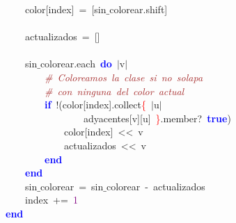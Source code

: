 \mbox{}\ \ \ \ \ \ \ \ \ \ \ \ color\textcolor{BrickRed}{[}index\textcolor{BrickRed}{]}\ \textcolor{BrickRed}{=}\ \textcolor{BrickRed}{[}sin$\_$colorear\textcolor{BrickRed}{.}shift\textcolor{BrickRed}{]} \\
\mbox{}\ \ \ \ \ \ \ \ \ \ \ \  \\
\mbox{}\ \ \ \ \ \ \ \ \ \ \ \ actualizados\ \textcolor{BrickRed}{=}\ \textcolor{BrickRed}{[]} \\
\mbox{}\ \ \ \ \ \ \ \ \ \ \ \  \\
\mbox{}\ \ \ \ \ \ \ \ \ \ \ \ sin$\_$colorear\textcolor{BrickRed}{.}each\ \textbf{\textcolor{Blue}{do}}\ \textcolor{BrickRed}{$|$}v\textcolor{BrickRed}{$|$} \\
\mbox{}\ \ \ \ \ \ \ \ \ \ \ \ \ \ \ \ \textit{\textcolor{Brown}{\#\ Coloreamos\ la\ clase\ si\ no\ solapa\ }} \\
\mbox{}\ \ \ \ \ \ \ \ \ \ \ \ \ \ \ \ \textit{\textcolor{Brown}{\#\ con\ ninguna\ del\ color\ actual}} \\
\mbox{}\ \ \ \ \ \ \ \ \ \ \ \ \ \ \ \ \textbf{\textcolor{Blue}{if}}\ \textcolor{BrickRed}{!(}color\textcolor{BrickRed}{[}index\textcolor{BrickRed}{].}collect\textcolor{Red}{\{}\ \textcolor{BrickRed}{$|$}u\textcolor{BrickRed}{$|$}\  \\
\mbox{}\ \ \ \ \ \ \ \ \ \ \ \ \ \ \ \ \ \ \ \ \ \ \ \ adyacentes\textcolor{BrickRed}{[}v\textcolor{BrickRed}{][}u\textcolor{BrickRed}{]}\ \textcolor{Red}{\}}\textcolor{BrickRed}{.}member?\ \textbf{\textcolor{Blue}{true}}\textcolor{BrickRed}{)} \\
\mbox{}\ \ \ \ \ \ \ \ \ \ \ \ \ \ \ \ \ \ \ \ color\textcolor{BrickRed}{[}index\textcolor{BrickRed}{]}\ \textcolor{BrickRed}{\textless{}\textless{}}\ v \\
\mbox{}\ \ \ \ \ \ \ \ \ \ \ \ \ \ \ \ \ \ \ \ actualizados\ \textcolor{BrickRed}{\textless{}\textless{}}\ v \\
\mbox{}\ \ \ \ \ \ \ \ \ \ \ \ \ \ \ \ \textbf{\textcolor{Blue}{end}} \\
\mbox{}\ \ \ \ \ \ \ \ \ \ \ \ \textbf{\textcolor{Blue}{end}} \\
\mbox{}\ \ \ \ \ \ \ \ \ \ \ \ sin$\_$colorear\ \textcolor{BrickRed}{=}\ sin$\_$colorear\ \textcolor{BrickRed}{-}\ actualizados \\
\mbox{}\ \ \ \ \ \ \ \ \ \ \ \ index\ \textcolor{BrickRed}{+=}\ \textcolor{Purple}{1} \\
\mbox{}\ \ \ \ \ \ \ \ \textbf{\textcolor{Blue}{end}} \\
\mbox{}\ \ \ \ \ \ \ \  \\
